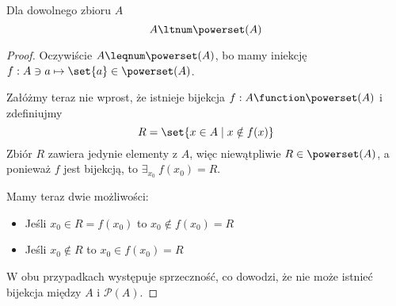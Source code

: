 \begin{theorem}[Cantor]
    Dla dowolnego zbioru \( A \)
    \[
        A \ltnum \powerset(A)
    \]
\end{theorem}
\begin{proof}
    Oczywiście \( A \leqnum \powerset(A) \), bo mamy iniekcję \( f: A \ni a \mapsto \set{a} \in \powerset(A) \).
    
    Załóżmy teraz nie wprost, że istnieje bijekcja \( f: A \function \powerset(A) \) i zdefiniujmy
    \[
        R = \set{ x \in A \mid x \notin f(x) }
    \]
    Zbiór \( R \) zawiera jedynie elementy z \( A \), więc niewątpliwie \( R \in \powerset(A) \), a ponieważ \( f \) jest bijekcją, to \( \exists_{x_0} \ f(x_0) = R \).
    
    Mamy teraz dwie możliwości:
    \begin{itemize}
        \item Jeśli \( x_0 \in R = f(x_0) \) to \( x_0 \notin f(x_0) = R \)
        \item Jeśli \( x_0 \notin R \) to \( x_0 \in f(x_0) = R \)
    \end{itemize}
    W obu przypadkach występuje sprzeczność, co dowodzi, że nie może istnieć bijekcja między \( A \) i \( \mathcal{P}(A) \).
\end{proof}